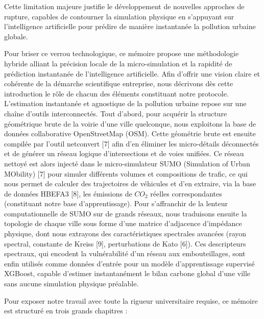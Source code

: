 \documentclass[10pt, a4paper]{article}
\begin{document}
Cette limitation majeure justifie le développement de nouvelles
approches de rupture, capables de contourner la simulation physique en
s'appuyant sur l'intelligence artificielle pour prédire de manière
instantanée la pollution urbaine globale.

Pour briser ce verrou technologique, ce mémoire propose une méthodologie
hybride alliant la précision locale de la micro-simulation et la
rapidité de prédiction instantanée de l'intelligence artificielle. Afin
d'offrir une vision claire et cohérente de la démarche scientifique
entreprise, nous décrivons dès cette introduction le rôle de chacun des
éléments constituant notre protocole. L'estimation instantanée et
agnostique de la pollution urbaine repose sur une chaîne d'outils
interconnectés. Tout d'abord, pour acquérir la structure géométrique
brute de la voirie d'une ville quelconque, nous exploitons la base de
données collaborative OpenStreetMap (OSM). Cette géométrie brute est
ensuite compilée par l'outil netconvert {[}7{]} afin d'en éliminer les
micro-détails déconnectés et de générer un réseau logique
d'intersections et de voies unifiées. Ce réseau nettoyé est alors
injecté dans le micro-simulateur SUMO (Simulation of Urban MObility)
{[}7{]} pour simuler différents volumes et compositions de trafic, ce
qui nous permet de calculer des trajectoires de véhicules et d'en
extraire, via la base de données HBEFA3 {[}8{]}, les émissions de
\(CO_2\) réelles correspondantes (constituant notre base
d'apprentissage). Pour s'affranchir de la lenteur computationnelle de
SUMO sur de grands réseaux, nous traduisons ensuite la topologie de
chaque ville sous forme d'une matrice d'adjacence d'impédance physique,
dont nous extrayons des caractéristiques spectrales avancées (rayon
spectral, constante de Kreiss {[}9{]}, perturbations de Kato {[}6{]}).
Ces descripteurs spectraux, qui encodent la vulnérabilité d'un réseau
aux embouteillages, sont enfin utilisés comme données d'entrée pour un
modèle d'apprentissage supervisé XGBoost, capable d'estimer
instantanément le bilan carbone global d'une ville sans aucune
simulation physique préalable.

Pour exposer notre travail avec toute la rigueur universitaire requise,
ce mémoire est structuré en trois grands chapitres :
\end{document}
